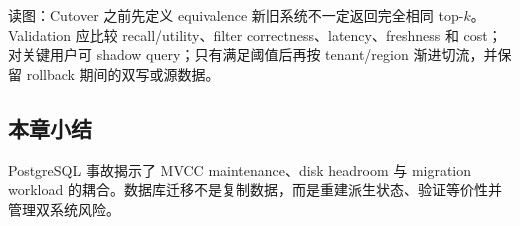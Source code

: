 
\begin{knowledgebox}{读图：Cutover 之前先定义 equivalence}
新旧系统不一定返回完全相同 top-$k$。Validation 应比较 recall/utility、filter correctness、latency、freshness 和 cost；对关键用户可 shadow query；只有满足阈值后再按 tenant/region 渐进切流，并保留 rollback 期间的双写或源数据。
\end{knowledgebox}


\subsection{本章小结}

PostgreSQL 事故揭示了 MVCC maintenance、disk headroom 与 migration workload 的耦合。数据库迁移不是复制数据，而是重建派生状态、验证等价性并管理双系统风险。

